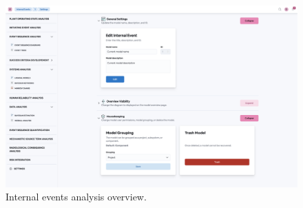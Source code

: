 \begin{figure}
  \centering
  \includegraphics[width=1.0\textwidth]{4_proposed_solution/web_app/figures/analysis_modes_types.png}
  \caption{Internal events analysis overview.}
  \label{fig:analysis_modes_types}
\end{figure}